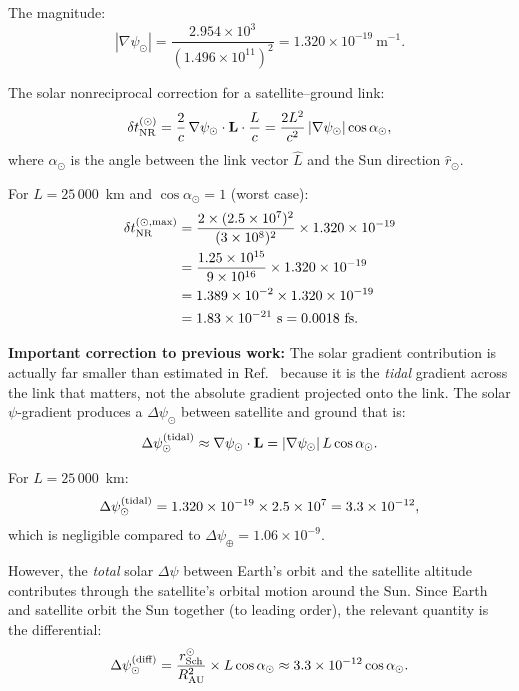 \documentclass[aps,prl,twocolumn,superscriptaddress,showpacs]{revtex4-2}
\newcommand{\rSch}{r_{\rm Sch}}
\begin{document}
The magnitude:
\begin{equation}
|\nabla\psi_\odot| = \frac{2.954\times 10^3}{(1.496\times 10^{11})^2}
= 1.320\times 10^{-19}~\text{m}^{-1}.
\end{equation}

The solar nonreciprocal correction for a satellite--ground link:
\begin{equation}
\delta t_{\rm NR}^{(\odot)} = \frac{2}{c}\,
\nabla\psi_\odot\cdot\mathbf{L}\cdot\frac{L}{c}
= \frac{2L^2}{c^2}\,|\nabla\psi_\odot|\cos\alpha_\odot,
\label{eq:NR_solar}
\end{equation}
where $\alpha_\odot$ is the angle between the link vector
$\hat{L}$ and the Sun direction $\hat{r}_\odot$.

For $L = 25\,000$~km and $\cos\alpha_\odot = 1$ (worst case):
\begin{align}
\delta t_{\rm NR}^{(\odot,\rm max)} &= \frac{2\times(2.5\times 10^7)^2}
{(3\times 10^8)^2}\times 1.320\times 10^{-19} \nonumber\\
&= \frac{1.25\times 10^{15}}{9\times 10^{16}}\times 1.320\times 10^{-19}
\nonumber\\
&= 1.389\times 10^{-2}\times 1.320\times 10^{-19} \nonumber\\
&= 1.83\times 10^{-21}~\text{s} = 0.0018~\text{fs}.
\end{align}

\textbf{Important correction to previous work:} The solar gradient
contribution is actually far smaller than estimated in Ref.~\cite{AlcockGPS2026}
because it is the \emph{tidal} gradient across the link that matters,
not the absolute gradient projected onto the link.  The solar
$\psi$-gradient produces a $\Delta\psi_\odot$ between satellite
and ground that is:
\begin{equation}
\Delta\psi_\odot^{(\rm tidal)} \approx \nabla\psi_\odot\cdot\mathbf{L}
= |\nabla\psi_\odot|\,L\cos\alpha_\odot.
\end{equation}

For $L = 25\,000$~km:
\begin{equation}
\Delta\psi_\odot^{(\rm tidal)} = 1.320\times 10^{-19}\times 2.5\times 10^7
= 3.3\times 10^{-12},
\end{equation}
which is negligible compared to $\Delta\psi_\oplus = 1.06\times 10^{-9}$.

However, the \emph{total} solar $\Delta\psi$ between Earth's
orbit and the satellite altitude contributes through the
satellite's orbital motion around the Sun.  Since Earth and
satellite orbit the Sun together (to leading order), the relevant
quantity is the differential:
\begin{equation}
\Delta\psi_\odot^{(\rm diff)} = \frac{\rSch^\odot}{R_{\rm AU}^2}
\times L\cos\alpha_\odot
\approx 3.3\times 10^{-12}\cos\alpha_\odot.
\end{equation}
\end{document}
